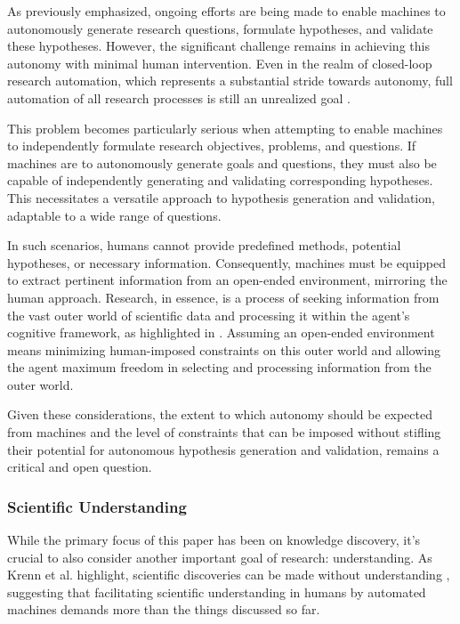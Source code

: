 \documentclass{article}
\begin{document}
As previously emphasized, ongoing efforts are being made to enable machines to autonomously generate research questions, formulate hypotheses, and validate these hypotheses. However, the significant challenge remains in achieving this autonomy with minimal human intervention. Even in the realm of closed-loop research automation, which represents a substantial stride towards autonomy, full automation of all research processes is still an unrealized goal \cite{zenil2023,coley2020autonomous,coley2020autonomousII}.

This problem becomes particularly serious when attempting to enable machines to independently formulate research objectives, problems, and questions. If machines are to autonomously generate goals and questions, they must also be capable of independently generating and validating corresponding hypotheses. This necessitates a versatile approach to hypothesis generation and validation, adaptable to a wide range of questions.

In such scenarios, humans cannot provide predefined methods, potential hypotheses, or necessary information. Consequently, machines must be equipped to extract pertinent information from an open-ended environment, mirroring the human approach. Research, in essence, is a process of seeking information from the vast outer world of scientific data and processing it within the agent's cognitive framework, as highlighted in \cite{hope2022computational}. Assuming an open-ended environment means minimizing human-imposed constraints on this outer world and allowing the agent maximum freedom in selecting and processing information from the outer world.

Given these considerations, the extent to which autonomy should be expected from machines and the level of constraints that can be imposed without stifling their potential for autonomous hypothesis generation and validation, remains a critical and open question.

\subsubsection{Scientific Understanding}
While the primary focus of this paper has been on knowledge discovery, it's crucial to also consider another important goal of research: understanding. As Krenn et al. highlight, scientific discoveries can be made without understanding \cite{krenn2022scientific}, suggesting that facilitating scientific understanding in humans by automated machines demands more than the things discussed so far.
\end{document}
